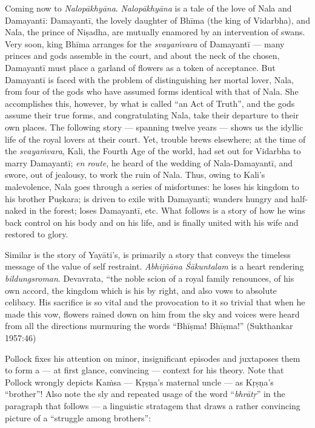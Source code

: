 Coming now to {\sl Nalopākhyāna}. {\sl Nalopākhyāna} is a tale of the love of Nala and Damayantī: Damayantī, the lovely daughter of Bhīma (the king of Vidarbha), and Nala, the prince of Niṣadha, are mutually enamored by an intervention of swans. Very soon, king Bhīma arranges for the {\sl svayaṁvara} of Damayantī --- many princes and gods assemble in the court, and about the neck of the chosen, Damayantī must place a garland of flowers as a token of acceptance. But Damayantī is faced with the problem of distinguishing her mortal lover, Nala, from four of the gods who have assumed forms identical with that of Nala. She accomplishes this, however, by what is called “an Act of Truth”, and the gods assume their true forms, and congratulating Nala, take their departure to their own places. The following story --- spanning twelve years --- shows us the idyllic life of the royal lovers at their court. Yet, trouble brews elsewhere; at the time of the {\sl svayaṁvara}, Kali, the Fourth Age of the world, had set out for Vidarbha to marry Damayantī; {\sl en route}, he heard of the wedding of Nala-Damayantī, and swore, out of jealousy, to work the ruin of Nala. Thus, owing to Kali's malevolence, Nala goes through a series of misfortunes: he loses his kingdom to his brother Puṣkara; is driven to exile with Damayantī; wanders hungry and half-naked in the forest; loses Damayantī, etc. What follows is a story of how he wins back control on his body and on his life, and is finally united with his wife and restored to glory. 

Similar is the story of Yayāti’s, is primarily a story that conveys the timeless message of the value of self restraint. {\sl Abhijñāna Śākuntalam} is a heart rendering {\sl bildungsroman}. Devavrata, “the noble scion of a royal family renounces, of his own accord, the kingdom which is his by right, and also vows to absolute celibacy. His sacrifice is so vital and the provocation to it so trivial that when he made this vow, flowers rained down on him from the sky and voices were heard from all the directions murmuring the words “Bhīṣma! Bhīṣma!” (Sukthankar 1957:46)

Pollock fixes his attention on minor, insignificant episodes and juxtaposes them to form a --- at first glance, convincing --- context for his theory. Note that Pollock wrongly depicts Kaṁsa --- Kṛṣṇa’s maternal uncle --- as  Kṛṣṇa's “brother”! Also note the sly and repeated usage of the word “{\sl bhrātṛ}” in the paragraph that follows --- a linguistic stratagem that draws a rather convincing picture of a “struggle among brothers”: 


